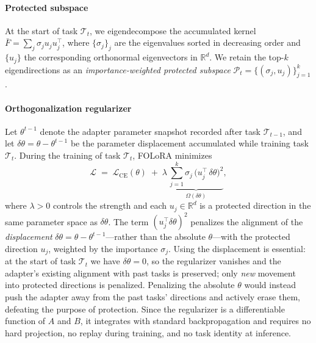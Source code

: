 \paragraph{Protected subspace}
At the start of task $\mathcal{T}_t$, we eigendecompose the accumulated kernel
$\bar{F}=\sum_j \sigma_j u_j u_j^{\!\top}$, where $\{\sigma_j\}_{j}$ are the
eigenvalues sorted in decreasing order and $\{u_j\}$ the corresponding orthonormal
eigenvectors in $\mathbb{R}^{d}$. We retain the top-$k$ eigendirections as
an \emph{importance-weighted protected subspace}
$\mathcal{P}_t=\{(\sigma_j,u_j)\}_{j=1}^{k}$.

\paragraph{Orthogonalization regularizer}
Let $\theta^{t-1}$ denote the adapter parameter snapshot recorded after task
$\mathcal{T}_{t-1}$, and let $\delta\theta=\theta-\theta^{t-1}$ be the parameter
displacement accumulated while training task $\mathcal{T}_t$. During the training of task
$\mathcal{T}_t$, FOLoRA minimizes
\begin{equation}
\mathcal{L} \;=\; \mathcal{L}_{\text{CE}}(\theta) \;+\; \lambda\,
\underbrace{\sum_{j=1}^{k}\sigma_j\,\big(u_j^{\!\top}\,\delta\theta\big)^{2}}_{\Omega(\delta\theta)},
\label{eq:loss}
\end{equation}
where $\lambda>0$ controls the strength and each $u_j\in\mathbb{R}^{d}$ is a protected
direction in the same parameter space as $\delta\theta$. The term
$(u_j^{\!\top}\delta\theta)^2$ penalizes the alignment of the \emph{displacement}
$\delta\theta=\theta-\theta^{t-1}$---rather than the absolute $\theta$---with the
protected direction $u_j$, weighted by the importance $\sigma_j$. Using the displacement
is essential: at the start of task $\mathcal{T}_t$ we have $\delta\theta=0$, so the
regularizer vanishes and the adapter's existing alignment with past tasks is preserved;
only \emph{new} movement into protected directions is penalized. Penalizing the absolute
$\theta$ would instead push the adapter away from the past tasks' directions and
actively erase them, defeating the purpose of protection. Since the regularizer is a
differentiable function of $A$ and $B$, it integrates with standard backpropagation and
requires no hard projection, no replay during training, and no task identity at inference.

